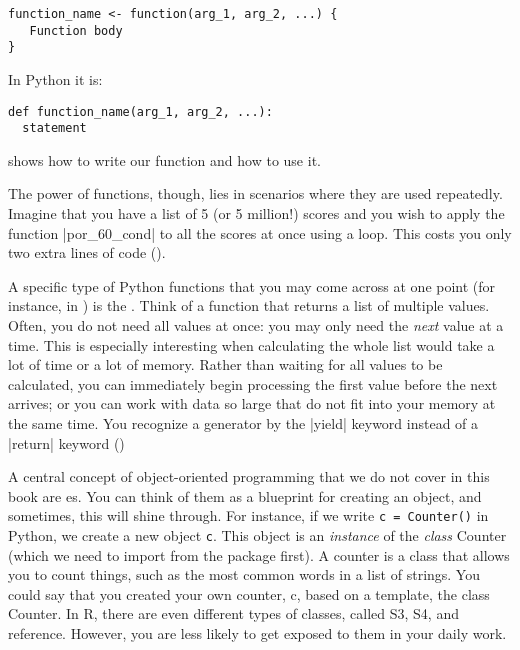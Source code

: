 \begin{verbatim}
function_name <- function(arg_1, arg_2, ...) {
   Function body 
}
\end{verbatim}

In Python it is:

\begin{verbatim}
def function_name(arg_1, arg_2, ...):
  statement
\end{verbatim}

 shows how to write our function and how to use it.

The power of functions, though, lies in scenarios where they are used
repeatedly.  Imagine that you have a list of 5 (or 5 million!) scores
and you wish to apply the function |por_60_cond| to all the scores at
once using a loop. This costs you only two extra lines of code
().



\begin{feature}
  A specific type of Python functions that you may come across at one point (for instance, in ) is the . Think of a function that returns a list of multiple values. Often, you do not need all values at once: you may only need the \emph{next} value at a time. This is especially interesting when calculating the whole list would take a lot of time or a lot of memory. Rather than waiting for all values to be calculated, you can immediately begin processing the first value before the next arrives; or you can work with data so large that do not fit into your memory at the same time.  You recognize a generator by the |yield| keyword instead of a |return| keyword ()
\end{feature}




\begin{feature}
  A central concept of object-oriented programming that we do not cover in this book are es. You can think of them as a blueprint for creating an object, and sometimes, this will shine through. For instance, if we write \texttt{c = Counter()} in Python, we create a new object \texttt{c}. This object is an \emph{instance} of the \emph{class} Counter (which we need to import from the package  first). A counter is a class that allows you to count things, such as the most common words in a list of strings. You could say that you created your own counter, c, based on a template, the class Counter. In R, there are even different types of classes, called S3, S4, and reference. However, you are less likely to get exposed to them in your daily work.
  \end{feature}



